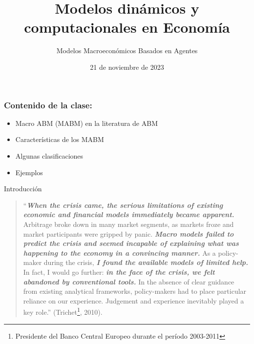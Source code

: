 \documentclass[11pt]{beamer}
\begin{document}
	\title{Modelos dinámicos y computacionales en Economía}
	\subtitle{Modelos Macroeconómicos Basados en Agentes}
	\date{21 de noviembre de 2023}


\begin{frame}
\frametitle{Contenido de la clase:}
\begin{itemize}
	\item Macro ABM (MABM) en la literatura de ABM
	\item Características de los MABM
	\item Algunas clasificaciones
	\item Ejemplos
\end{itemize}
\end{frame}

\begin{frame}{Introducción}
\begin{quote}
\small    ``\textit{\textbf{When the crisis came, the serious limitations of existing economic and financial models immediately became apparent.}} Arbitrage broke down in many market segments, as markets froze and market participants were gripped by panic. \textit{\textbf{Macro models failed to predict the crisis and seemed incapable of explaining what was happening to the economy in a convincing manner.}} As a policy-maker during the crisis, \textit{\textbf{I found the available models of limited help.}} In fact, I would go further: \textit{\textbf{in the face of the crisis, we felt abandoned by conventional tools.}} In the absence of clear guidance from existing analytical frameworks, policy-makers had to place particular reliance on our experience. Judgement and experience inevitably played a key role.'' (Trichet\footnote{ Presidente del Banco Central Europeo durante el período 2003-2011}, 2010).
\end{quote}
\end{frame}
\end{document}
